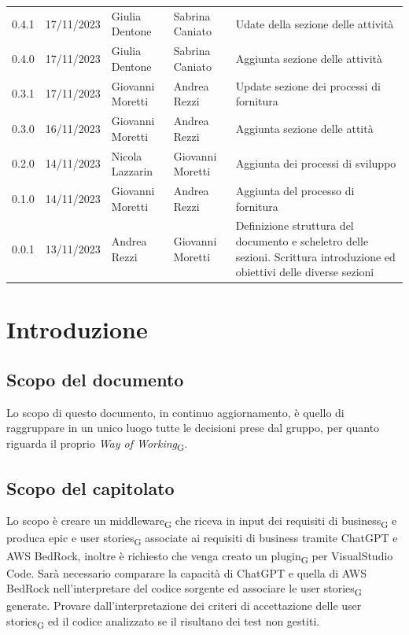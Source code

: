 \documentclass{article}
\begin{document}
\begin{center}
\begin{tabular}{P{4em} P{6em} P{8em} P{8em} P{10em}} 
    0.4.1 & 17/11/2023 & Giulia Dentone & Sabrina Caniato & Udate della sezione delle attività\\
    0.4.0 & 17/11/2023 & Giulia Dentone & Sabrina Caniato & Aggiunta sezione delle attività \\
    0.3.1 & 17/11/2023 & Giovanni Moretti & Andrea Rezzi & Update sezione dei processi di fornitura\\
    0.3.0 & 16/11/2023 & Giovanni Moretti & Andrea Rezzi & Aggiunta sezione delle attità \\
    0.2.0 & 14/11/2023 & Nicola Lazzarin & Giovanni Moretti & Aggiunta dei processi di sviluppo \\
    0.1.0 & 14/11/2023 & Giovanni Moretti & Andrea Rezzi & Aggiunta del processo di fornitura \\
    0.0.1 & 13/11/2023 & Andrea Rezzi & Giovanni Moretti & Definizione struttura del documento e scheletro delle sezioni. Scrittura introduzione ed obiettivi delle diverse sezioni\\
\end{tabular}
\end{center}
\newpage
\tableofcontents
\newpage

\section{Introduzione}

\subsection{Scopo del documento}
Lo scopo di questo documento, in continuo aggiornamento, è quello di raggruppare in un unico luogo tutte le decisioni prese dal gruppo, per quanto riguarda il proprio \textit{Way of Working}\textsubscript{G}.

\subsection{Scopo del capitolato}
Lo scopo è creare un middleware\textsubscript{G} che riceva in input dei requisiti di business\textsubscript{G} e produca epic e user stories\textsubscript{G} associate ai requisiti di business tramite ChatGPT e AWS BedRock, inoltre è richiesto che venga creato un plugin\textsubscript{G} per VisualStudio Code.
Sarà necessario comparare la capacità di ChatGPT e quella di AWS BedRock nell'interpretare del codice sorgente ed associare le user stories\textsubscript{G} generate. Provare dall'interpretazione dei criteri di accettazione delle user stories\textsubscript{G} ed il codice analizzato se il risultano dei test non gestiti.
\end{document}
